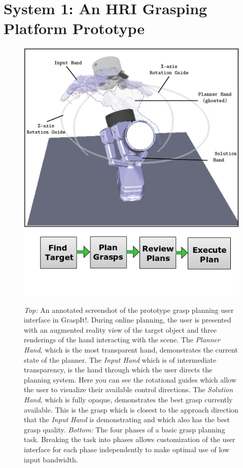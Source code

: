 \section*{System 1: An HRI Grasping Platform Prototype}
\setcounter{subsection}{0}
\label{sec:pipeline_1}
\begin{figure}
	\centering
	\includegraphics[width=.8\columnwidth]{ui_1.png}
	\includegraphics[width=.8\columnwidth]{images_4/overview_pipeline.png}\\
	\caption{ \emph{Top:} An annotated screenshot of the prototype grasp planning user interface in GraspIt!. During online planning, the user is presented with an augmented reality view of the target object and three renderings of the hand interacting with the scene. The \emph{Planner Hand}, which is the most transparent hand, demonstrates the current state of the planner. The \emph{Input Hand} which is of intermediate transparency, is the hand through which the user directs the planning system. Here you can see the rotational guides which allow the user to visualize their available control directions. The \emph{Solution Hand}, which is fully opaque, demonstrates the best grasp currently available. This is the grasp which is closest to the approach direction that the \emph{Input Hand} is demonstrating and which also has the best grasp quality. \emph{Bottom:} The four phases of a basic grasp planning task. Breaking the task into phases allows customization of the user interface for each phase independently to make optimal use of low input bandwidth.}
	\label{fig:overview_pipeline}
\end{figure}
